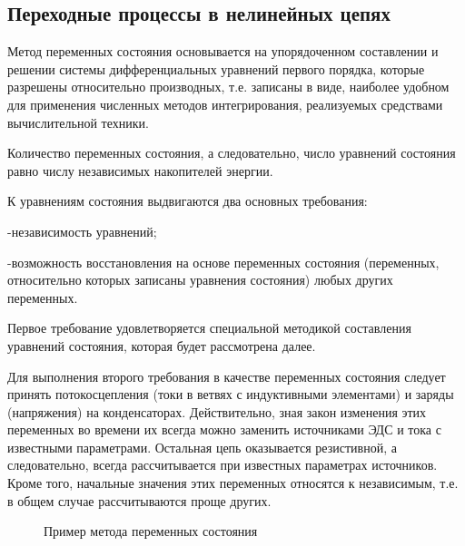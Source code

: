 \subsection{Переходные процессы в нелинейных цепях}



Метод переменных состояния основывается на упорядоченном составлении и решении системы дифференциальных уравнений первого порядка, которые разрешены относительно производных, т.е. записаны в виде, наиболее удобном для применения численных методов интегрирования, реализуемых средствами вычислительной техники.

Количество переменных состояния, а следовательно, число уравнений состояния равно числу независимых накопителей энергии.

К уравнениям состояния выдвигаются два основных требования:

-независимость уравнений;

-возможность восстановления на основе переменных состояния (переменных, относительно которых записаны уравнения состояния) любых других переменных.

Первое требование удовлетворяется специальной методикой составления уравнений состояния, которая будет рассмотрена далее.

Для выполнения второго требования в качестве переменных состояния следует принять потокосцепления (токи в ветвях с индуктивными элементами) и заряды (напряжения) на конденсаторах. Действительно, зная закон изменения этих переменных во времени их всегда можно заменить источниками ЭДС и тока с известными параметрами. Остальная цепь оказывается резистивной, а следовательно, всегда рассчитывается при известных параметрах источников. Кроме того, начальные значения этих переменных относятся к независимым, т.е. в общем случае рассчитываются проще других.
\pagebreak

\begin{center}
	\begin{figure}[h!]
		\caption{Пример метода переменных состояния}	
	\end{figure}
\end{center}


\pagebreak

